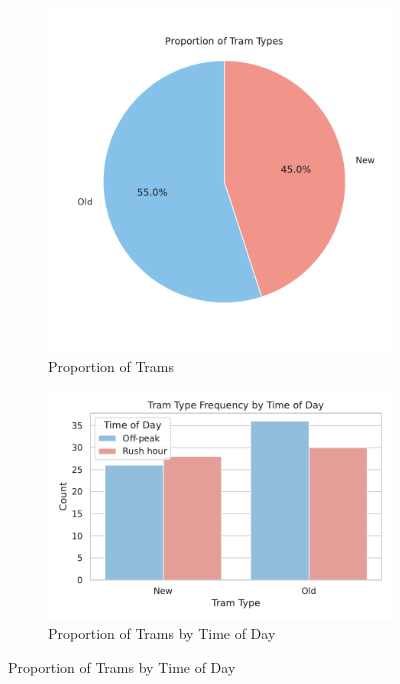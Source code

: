 \documentclass[a4paper, 10pt]{article}
\begin{document}
				\begin{figure}[h!]
					\centering
					\begin{subfigure}[b]{0.48\textwidth}
						\centering
						\includegraphics[width=\textwidth]{Plot_TramProportions.pdf}
						\caption{Proportion of Trams}
						\label{fig:proportion_of_trams_by_type}
					\end{subfigure}	
					\hfill
					\begin{subfigure}[b]{0.48\textwidth}
						\centering
						\includegraphics[width=\textwidth]{Plot_TramFrequencyByTimeOfDay.pdf}
						\caption{Proportion of Trams by Time of Day}
						\label{fig:proportion_of_trams_by_time_of_day}
					\end{subfigure}
				\end{figure}
\end{document}
